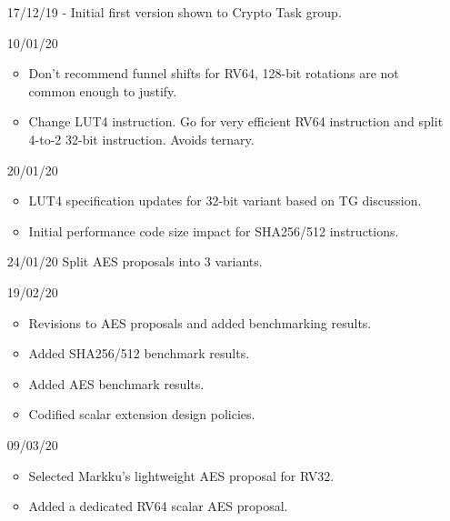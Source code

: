 
\begin{itemize}
\item[17/12/19] - Initial first version shown to Crypto Task group.
\item[10/01/20] \begin{itemize}
    \item Don't recommend funnel shifts for RV64, 128-bit rotations
          are not common enough to justify.
    \item Change LUT4 instruction. Go for very efficient RV64 instruction
          and split 4-to-2 32-bit instruction. Avoids ternary.
    \end{itemize}
\item[20/01/20] \begin{itemize}
    \item LUT4 specification updates for 32-bit variant based on TG discussion.
    \item Initial performance code size impact for SHA256/512 instructions.
    \end{itemize}
\item[24/01/20] Split AES proposals into 3 variants.
\item[19/02/20] \begin{itemize}
    \item Revisions to AES proposals and added benchmarking results.
    \item Added SHA256/512 benchmark results.
    \item Added AES        benchmark results.
    \item Codified scalar extension design policies.
    \end{itemize}
\item[09/03/20] \begin{itemize}
    \item Selected Markku's lightweight AES proposal for RV32.
    \item Added a dedicated RV64 scalar AES proposal.
\end{itemize}
\end{itemize}
